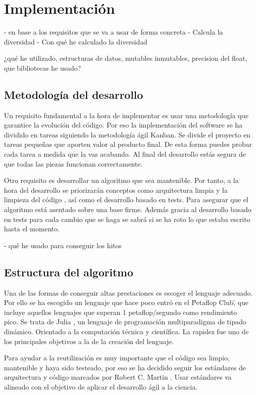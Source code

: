 \chapter{Implementación}

- en base a los requisitos que se va a usar de forma concreta
- Calcula la diversidad - Con qué he calculado la diversidad

¿qué he utilizado, estructuras de datos, mutables inmutables, precision del float, que bibliotecas he usado?

\section{Metodología del desarrollo}

Un requisito fundamental a la hora de implementar es usar una metodología que garantice la evolución del código. Por eso la implementación 
del software se ha dividido en tareas siguiendo la metodología ágil Kanban. Se divide el proyecto en tareas pequeñas que aporten valor al producto 
final. De esta forma puedes probar cada tarea a medida que la vas acabando. Al final del desarrollo estás segura de que todas las piezas funcionan
correctamente.

Otro requisito es desarrollar un algoritmo que sea mantenible. Por tanto, a la hora del desarrollo se priorizarán conceptos 
como arquitectura limpia \cite{cleanArquitecture2017} y la limpieza del código \cite{cleanCode2008}, así como el desarrollo basado en tests. Para asegurar 
que el algoritmo está asentado sobre una base firme. Además gracia al desarrollo basado en tests para cada cambio que se haga 
se sabrá si se ha roto lo que estaba escrito hasta el momento. 

- qué he usado para conseguir los hitos
\section{Estructura del algoritmo}

Una de las formas de conseguir altas prestaciones es escoger el lenguaje adecuado. Por ello se ha escogido un lenguaje que
hace poco entró en el \"Petaflop Club\", que incluye aquellos lenguajes que superan 1 petaflop/segundo como rendimiento pico. Se trata
de Julia \cite{julia}, un lenguaje de programación multiparadigma de tipado dinámico. Orientado a la computación técnica y 
científica. La rapidez fue uno de los principales objetivos a la de la creación del lenguaje. 

Para ayudar a la reutilización es muy importante que el código sea limpio, mantenible y haya sido testeado, por eso se ha decidido seguir los estándares de arquitectura y código marcados 
por Robert C. Martin \cite{cleanArquitecture2017, cleanCode2008}. Usar estándares va alineado con el objetivo de aplicar el desarrollo ágil a la ciencia.
